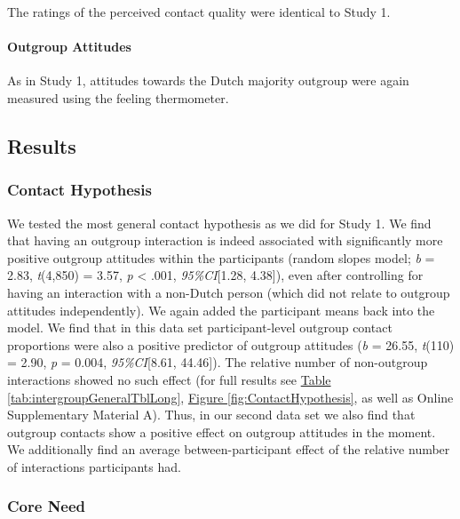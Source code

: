 \documentclass[man, 12pt, a4paper, mask]{apa7}
\theoremstyle{break}
\theoremstyle{plain}
\newcommand{\fgrref}[2][]{\hyperref[#2]{Figure \ref*{#2}#1}}
\newcommand{\tblref}[2][]{\hyperref[#2]{Table \ref*{#2}#1}}
\begin{document}
The ratings of the perceived contact quality were identical to Study 1.

\paragraph{Outgroup Attitudes}

As in Study 1, attitudes towards the Dutch majority outgroup were again
measured using the feeling thermometer.

\subsection{Results}

\subsubsection{Contact Hypothesis}

We tested the most general contact hypothesis as we did for Study 1. We
find that having an outgroup interaction is indeed associated with
significantly more positive outgroup attitudes within the participants
(random slopes model; \textit{b} = 2.83, \textit{t}(4,850) = 3.57,
\textit{p} \textless{} .001, \textit{95\%CI}{[}1.28, 4.38{]}), even
after controlling for having an interaction with a non-Dutch person
(which did not relate to outgroup attitudes independently). We again
added the participant means back into the model. We find that in this
data set participant-level outgroup contact proportions were also a
positive predictor of outgroup attitudes (\textit{b} = 26.55,
\textit{t}(110) = 2.90, \textit{p} = 0.004, \textit{95\%CI}{[}8.61,
44.46{]}). The relative number of non-outgroup interactions showed no
such effect (for full results see \tblref{tab:intergroupGeneralTblLong},
\fgrref{fig:ContactHypothesis}, as well as Online Supplementary Material
A). Thus, in our second data set we also find that outgroup contacts
show a positive effect on outgroup attitudes in the moment. We
additionally find an average between-participant effect of the relative
number of interactions participants had.

\subsubsection{Core Need}
\end{document}
